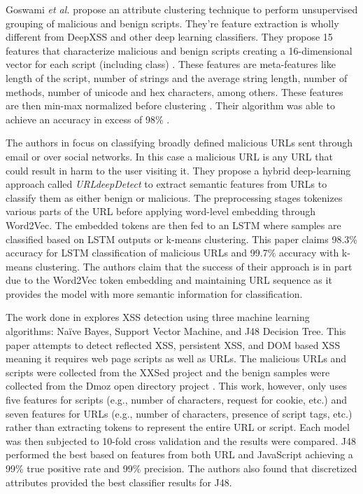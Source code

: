 Goswami \textit{et al.} propose an attribute clustering technique to perform unsupervised grouping of malicious and benign scripts. They're feature extraction is wholly different from DeepXSS and other deep learning classifiers. They propose 15 features that characterize malicious and benign scripts creating a 16-dimensional vector for each script (including class) \cite{goswami2017unsupervised}. These features are meta-features like length of the script, number of strings and the average string length, number of methods, number of unicode and hex characters, among others. These features are then min-max normalized before clustering \cite{goswami2017unsupervised}. Their algorithm was able to achieve an accuracy in excess of 98\% \cite{goswami2017unsupervised}.  

The authors in \cite{afzal2021deeplearning} focus on classifying broadly defined malicious URLs sent through email or over social networks.  In this case a malicious URL is any URL that could result in harm to the user visiting it.  They propose a hybrid deep-learning approach called \textit{URLdeepDetect} to extract semantic features from URLs to classify them as either benign or malicious.  The preprocessing stages tokenizes various parts of the URL before applying word-level embedding through Word2Vec.  The embedded tokens are then fed to an LSTM where samples are classified based on LSTM outputs or k-means clustering.  This paper claims 98.3\% accuracy for LSTM classification of malicious URLs and 99.7\% accuracy with k-means clustering.  The authors claim that the success of their approach is in part due to the Word2Vec token embedding and maintaining URL sequence as it provides the model with more semantic information for classification.

The work done in \cite{vishnu2014prediction} explores XSS detection using three machine learning algorithms: Naïve Bayes, Support Vector Machine, and J48 Decision Tree.  This paper attempts to detect reflected XSS, persistent XSS, and DOM based XSS meaning it requires web page scripts as well as URLs.  The malicious URLs and scripts were collected from the XXSed \cite{xssed} project and the benign samples were collected from the Dmoz open directory project \cite{dmoz}.  This work, however, only uses five features for scripts (e.g., number of characters, request for cookie, etc.) and seven features for URLs (e.g., number of characters, presence of script tags, etc.) rather than extracting tokens to represent the entire URL or script.  Each model was then subjected to 10-fold cross validation and the results were compared.  J48 performed the best based on features from both URL and JavaScript achieving a 99\% true positive rate and 99\% precision.  The authors also found that discretized attributes provided the best classifier results for J48.

